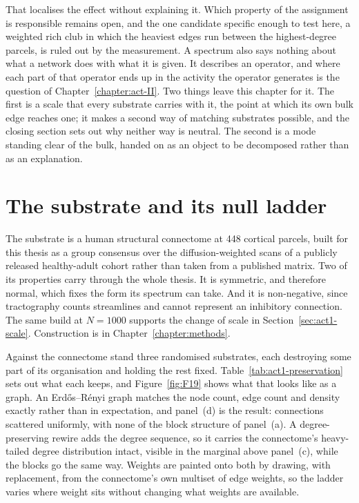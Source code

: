 That localises the effect without explaining it. Which property of the
assignment is responsible remains open, and the one candidate specific enough to
test here, a weighted rich club in which the heaviest edges run between the
highest-degree parcels, is ruled out by the measurement. A spectrum also says
nothing about what a network does with what it is given. It describes an
operator, and where each part of that operator ends up in the activity the
operator generates is the question of Chapter~\ref{chapter:act-II}. Two things 
leave this chapter for it. The first is a scale that every substrate carries with 
it, the point at which its own bulk edge reaches one; it makes a second way of 
matching substrates possible, and the closing section sets out why neither way is 
neutral. The second is a mode standing clear of the bulk, handed on as an object 
to be decomposed rather than as an explanation.






\section{The substrate and its null ladder}
\label{sec:act1-substrate}
\bigskip

The substrate is a human structural connectome at 448 cortical
parcels, %
built for this thesis as a group consensus over the diffusion-weighted scans of
a publicly released healthy-adult cohort \cite{griffa2019structural,
suarez2021learning} rather than taken from a published matrix. Two of its
properties carry through the whole thesis. It is symmetric, and therefore
normal, which fixes the form its spectrum can take. And it is non-negative,
since tractography counts streamlines and cannot represent an inhibitory
connection. The same build at
$N = 1000$ %
supports the change of scale in Section~\ref{sec:act1-scale}. Construction is in
Chapter~\ref{chapter:methods}.

Against the connectome stand three randomised substrates, each destroying some
part of its organisation and holding the rest fixed.
Table~\ref{tab:act1-preservation} sets out what each keeps, and
Figure~\ref{fig:F19} shows what that looks like as a graph. An Erdős–Rényi
graph matches the node count, edge count and density exactly rather than in
expectation, and panel~(d) is the result: connections scattered uniformly, with
none of the block structure of panel~(a). A degree-preserving rewire adds the
degree sequence, so it carries the connectome's heavy-tailed degree
distribution intact, visible in the marginal above panel~(c), while the blocks
go the same way. Weights are painted onto both by drawing, with replacement,
from the connectome's own multiset of edge
weights, %
so the ladder varies where weight sits without changing what weights are
available.

